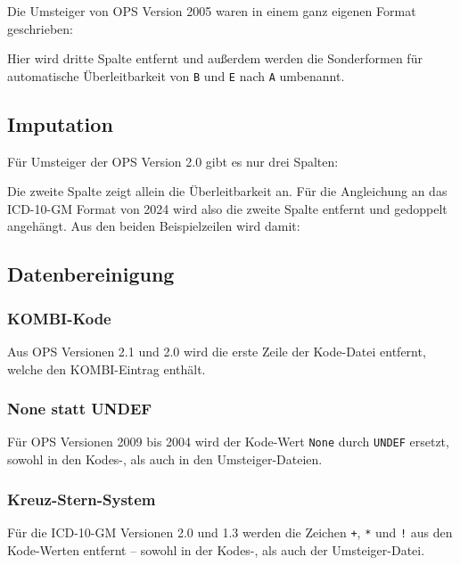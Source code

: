 Die Umsteiger von OPS Version 2005 waren in einem ganz eigenen Format geschrieben:


Hier wird dritte Spalte entfernt und außerdem werden die Sonderformen für automatische Überleitbarkeit von \texttt{B} und \texttt{E} nach \texttt{A} umbenannt. 

\subsection{Imputation}

Für Umsteiger der OPS Version 2.0 gibt es nur drei Spalten: 


Die zweite Spalte zeigt allein die Überleitbarkeit an. Für die Angleichung an das ICD-10-GM Format von 2024 wird also die zweite Spalte entfernt und gedoppelt angehängt. Aus den beiden Beispielzeilen wird damit:


\subsection{Datenbereinigung}

\subsubsection{KOMBI-Kode} Aus OPS Versionen 2.1 und 2.0 wird die erste Zeile der Kode-Datei entfernt, welche den KOMBI-Eintrag enthält. 

 \subsubsection{None statt UNDEF} Für OPS Versionen 2009 bis 2004 wird der Kode-Wert \texttt{None} durch \texttt{UNDEF} ersetzt, sowohl in den Kodes-, als auch in den Umsteiger-Dateien. 

\subsubsection{Kreuz-Stern-System} Für die ICD-10-GM Versionen 2.0 und 1.3 werden die Zeichen \texttt{+}, \texttt{*} und \texttt{!} aus den Kode-Werten entfernt -- sowohl in der Kodes-, als auch der Umsteiger-Datei.

